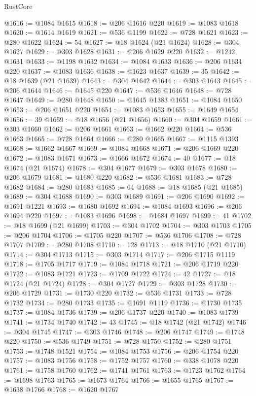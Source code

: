 \begin{lexlean}{RustCore}
\begin{coremodule}
@1616 := @1084 @1615
@1618 := @206 @1616 @220
@1619 := @1083 @1618
@1620 := @1614 @1619
@1621 := @536 @1199
@1622 := @728 @1621
@1623 := @280 @1622
@1624 := 54
@1627 := @18 @1624 (@21 @1624)
@1628 := @304 @1627
@1629 := @303 @1628
@1631 := @206 @1629 @220
@1632 := @1242 @1631
@1633 := @1198 @1632
@1634 := @1084 @1633
@1636 := @206 @1634 @220
@1637 := @1083 @1636
@1638 := @1623 @1637
@1639 := 35
@1642 := @18 @1639 (@21 @1639)
@1643 := @304 @1642
@1644 := @303 @1643
@1645 := @206 @1644
@1646 := @1645 @220
@1647 := @536 @1646
@1648 := @728 @1647
@1649 := @280 @1648
@1650 := @1645 @1383
@1651 := @1084 @1650
@1653 := @206 @1651 @220
@1654 := @1083 @1653
@1655 := @1649 @1654
@1656 := 39
@1659 := @18 @1656 (@21 @1656)
@1660 := @304 @1659
@1661 := @303 @1660
@1662 := @206 @1661
@1663 := @1662 @220
@1664 := @536 @1663
@1665 := @728 @1664
@1666 := @280 @1665
@1667 := @1115 @1393
@1668 := @1662 @1667
@1669 := @1084 @1668
@1671 := @206 @1669 @220
@1672 := @1083 @1671
@1673 := @1666 @1672
@1674 := 40
@1677 := @18 @1674 (@21 @1674)
@1678 := @304 @1677
@1679 := @303 @1678
@1680 := @206 @1679
@1681 := @1680 @220
@1682 := @536 @1681
@1683 := @728 @1682
@1684 := @280 @1683
@1685 := 64
@1688 := @18 @1685 (@21 @1685)
@1689 := @304 @1688
@1690 := @303 @1689
@1691 := @206 @1690
@1692 := @1691 @1221
@1693 := @1680 @1692
@1694 := @1084 @1693
@1696 := @206 @1694 @220
@1697 := @1083 @1696
@1698 := @1684 @1697
@1699 := 41
@1702 := @18 @1699 (@21 @1699)
@1703 := @304 @1702
@1704 := @303 @1703
@1705 := @206 @1704
@1706 := @1705 @220
@1707 := @536 @1706
@1708 := @728 @1707
@1709 := @280 @1708
@1710 := 128
@1713 := @18 @1710 (@21 @1710)
@1714 := @304 @1713
@1715 := @303 @1714
@1717 := @206 @1715 @1119
@1718 := @1705 @1717
@1719 := @1084 @1718
@1721 := @206 @1719 @220
@1722 := @1083 @1721
@1723 := @1709 @1722
@1724 := 42
@1727 := @18 @1724 (@21 @1724)
@1728 := @304 @1727
@1729 := @303 @1728
@1730 := @206 @1729
@1731 := @1730 @220
@1732 := @536 @1731
@1733 := @728 @1732
@1734 := @280 @1733
@1735 := @1691 @1119
@1736 := @1730 @1735
@1737 := @1084 @1736
@1739 := @206 @1737 @220
@1740 := @1083 @1739
@1741 := @1734 @1740
@1742 := 43
@1745 := @18 @1742 (@21 @1742)
@1746 := @304 @1745
@1747 := @303 @1746
@1748 := @206 @1747
@1749 := @1748 @220
@1750 := @536 @1749
@1751 := @728 @1750
@1752 := @280 @1751
@1753 := @1748 @1521
@1754 := @1084 @1753
@1756 := @206 @1754 @220
@1757 := @1083 @1756
@1758 := @1752 @1757
@1760 := @338 @1078 @220
@1761 := @1758 @1760
@1762 := @1741 @1761
@1763 := @1723 @1762
@1764 := @1698 @1763
@1765 := @1673 @1764
@1766 := @1655 @1765
@1767 := @1638 @1766
@1768 := @1620 @1767

\end{coremodule}
\end{lexlean}
